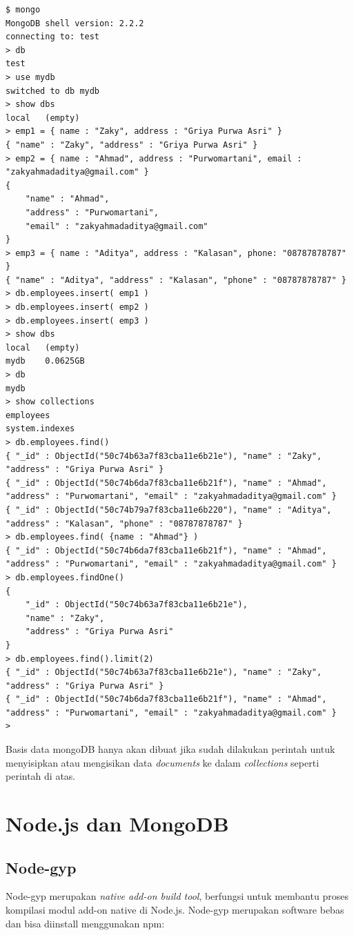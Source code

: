 \lstset{language=bash,caption=Sesi dalam shell mongoDB}
\begin{lstlisting}
$ mongo
MongoDB shell version: 2.2.2
connecting to: test
> db
test
> use mydb
switched to db mydb
> show dbs
local	(empty)
> emp1 = { name : "Zaky", address : "Griya Purwa Asri" }
{ "name" : "Zaky", "address" : "Griya Purwa Asri" }
> emp2 = { name : "Ahmad", address : "Purwomartani", email : "zakyahmadaditya@gmail.com" }
{
	"name" : "Ahmad",
	"address" : "Purwomartani",
	"email" : "zakyahmadaditya@gmail.com"
}
> emp3 = { name : "Aditya", address : "Kalasan", phone: "08787878787" }
{ "name" : "Aditya", "address" : "Kalasan", "phone" : "08787878787" }
> db.employees.insert( emp1 )
> db.employees.insert( emp2 )
> db.employees.insert( emp3 )
> show dbs
local	(empty)
mydb	0.0625GB
> db
mydb
> show collections
employees
system.indexes
> db.employees.find()
{ "_id" : ObjectId("50c74b63a7f83cba11e6b21e"), "name" : "Zaky", "address" : "Griya Purwa Asri" }
{ "_id" : ObjectId("50c74b6da7f83cba11e6b21f"), "name" : "Ahmad", "address" : "Purwomartani", "email" : "zakyahmadaditya@gmail.com" }
{ "_id" : ObjectId("50c74b79a7f83cba11e6b220"), "name" : "Aditya", "address" : "Kalasan", "phone" : "08787878787" }
> db.employees.find( {name : "Ahmad"} )
{ "_id" : ObjectId("50c74b6da7f83cba11e6b21f"), "name" : "Ahmad", "address" : "Purwomartani", "email" : "zakyahmadaditya@gmail.com" }
> db.employees.findOne()
{
	"_id" : ObjectId("50c74b63a7f83cba11e6b21e"),
	"name" : "Zaky",
	"address" : "Griya Purwa Asri"
}
> db.employees.find().limit(2)
{ "_id" : ObjectId("50c74b63a7f83cba11e6b21e"), "name" : "Zaky", "address" : "Griya Purwa Asri" }
{ "_id" : ObjectId("50c74b6da7f83cba11e6b21f"), "name" : "Ahmad", "address" : "Purwomartani", "email" : "zakyahmadaditya@gmail.com" }
> 
\end{lstlisting}

Basis data mongoDB hanya akan dibuat jika sudah dilakukan perintah untuk menyisipkan atau mengisikan data \textit{documents} ke dalam \textit{collections} seperti perintah di atas.

\section{Node.js dan MongoDB}

\subsection{Node-gyp}

Node-gyp merupakan \textit{native add-on build tool}, berfungsi untuk membantu proses kompilasi modul add-on native di Node.js. Node-gyp merupakan software bebas dan bisa diinstall menggunakan npm:

